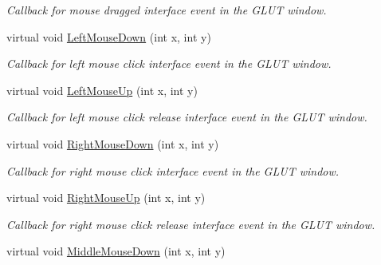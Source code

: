 \begin{DoxyCompactItemize}
\begin{DoxyCompactList}\small\item\em Callback for mouse dragged interface event in the G\+L\+UT window. \end{DoxyCompactList}\item 
virtual void \hyperlink{classimage__tools_1_1BaseGfxApp_a329831f9843ed220fb8ec757f1e72b84}{Left\+Mouse\+Down} (int x, int y)\hypertarget{classimage__tools_1_1BaseGfxApp_a329831f9843ed220fb8ec757f1e72b84}{}\label{classimage__tools_1_1BaseGfxApp_a329831f9843ed220fb8ec757f1e72b84}

\begin{DoxyCompactList}\small\item\em Callback for left mouse click interface event in the G\+L\+UT window. \end{DoxyCompactList}\item 
virtual void \hyperlink{classimage__tools_1_1BaseGfxApp_a38e8246acf13e59f7d563e1bb479fdba}{Left\+Mouse\+Up} (int x, int y)\hypertarget{classimage__tools_1_1BaseGfxApp_a38e8246acf13e59f7d563e1bb479fdba}{}\label{classimage__tools_1_1BaseGfxApp_a38e8246acf13e59f7d563e1bb479fdba}

\begin{DoxyCompactList}\small\item\em Callback for left mouse click release interface event in the G\+L\+UT window. \end{DoxyCompactList}\item 
virtual void \hyperlink{classimage__tools_1_1BaseGfxApp_a62302f1b34b93f21b8bcdfe6bbfed6c7}{Right\+Mouse\+Down} (int x, int y)\hypertarget{classimage__tools_1_1BaseGfxApp_a62302f1b34b93f21b8bcdfe6bbfed6c7}{}\label{classimage__tools_1_1BaseGfxApp_a62302f1b34b93f21b8bcdfe6bbfed6c7}

\begin{DoxyCompactList}\small\item\em Callback for right mouse click interface event in the G\+L\+UT window. \end{DoxyCompactList}\item 
virtual void \hyperlink{classimage__tools_1_1BaseGfxApp_a96716278afda904913202685a0d7e146}{Right\+Mouse\+Up} (int x, int y)\hypertarget{classimage__tools_1_1BaseGfxApp_a96716278afda904913202685a0d7e146}{}\label{classimage__tools_1_1BaseGfxApp_a96716278afda904913202685a0d7e146}

\begin{DoxyCompactList}\small\item\em Callback for right mouse click release interface event in the G\+L\+UT window. \end{DoxyCompactList}\item 
virtual void \hyperlink{classimage__tools_1_1BaseGfxApp_adc07f734785ac1863d69e484b3b14e9c}{Middle\+Mouse\+Down} (int x, int y)\hypertarget{classimage__tools_1_1BaseGfxApp_adc07f734785ac1863d69e484b3b14e9c}{}\label{classimage__tools_1_1BaseGfxApp_adc07f734785ac1863d69e484b3b14e9c}


\end{DoxyCompactItemize}
